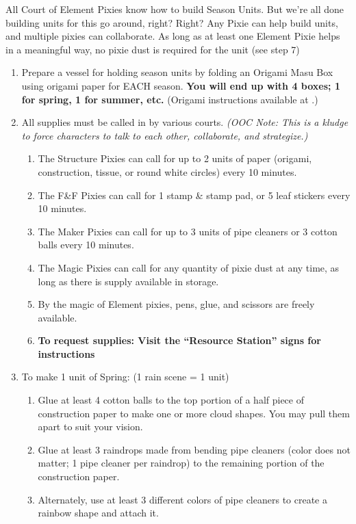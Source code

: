 \documentclass[green]{PP}
\begin{document}
\name{\gSesons{}}

All Court of Element Pixies know how to build Season Units. But we’re all done building units for this go around, right? Right? Any Pixie can help build units, and multiple pixies can collaborate. As long as at least one Element Pixie helps in a meaningful way, no pixie dust is required for the unit (see step 7)

\begin{enumerate}
	\item Prepare a vessel for holding season units by folding an Origami Masu Box using origami paper for EACH season. \textbf{You will end up with 4 boxes; 1 for spring, 1 for summer, etc.} (Origami instructions available at \sResourceElements{}.)
	\item All supplies must be called in by various courts. \textit{(OOC Note: This is a kludge to force characters to talk to each other, collaborate, and strategize.)}
	\begin{enumerate}
		\item The Structure Pixies can call for up to 2 units of paper (origami, construction, tissue, or round white circles) every 10 minutes.
		\item The F\&F Pixies can call for 1 stamp \& stamp pad, or 5 leaf stickers every 10 minutes.
		\item The Maker Pixies can call for up to 3 units of pipe cleaners or 3 cotton balls every 10 minutes.
		\item The Magic Pixies can call for any quantity of pixie dust at any time, as long as there is supply available in storage.
		\item By the magic of Element pixies, pens, glue, and scissors are freely available.
		\item \textbf{To request supplies: Visit the ``Resource Station'' signs for instructions}
	\end{enumerate}
	\item To make 1 unit of Spring: (1 rain scene = 1 unit)
	\begin{enumerate}
		\item Glue at least 4 cotton balls to the top portion of a half piece of construction paper to make one or more cloud shapes. You may pull them apart to suit your vision.
		\item Glue at least 3 raindrops made from bending pipe cleaners (color does not matter; 1 pipe cleaner per raindrop) to the remaining portion of the construction paper.
		\item Alternately, use at least 3 different colors of pipe cleaners to create a rainbow shape and attach it.

\end{enumerate}
\end{enumerate}
\end{document}
